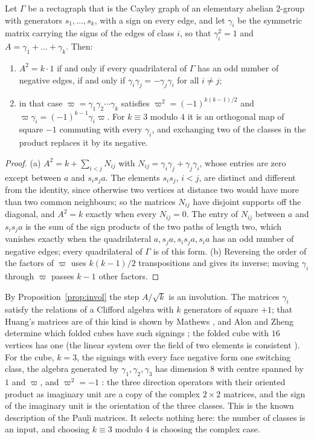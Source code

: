 \begin{proposition}\label{prop:clifford}
Let $\Gamma$ be a rectagraph that is the Cayley graph of an elementary abelian $2$-group with generators $s_1,\dots,s_k$, with a sign on every edge, and let $\gamma_i$ be the symmetric matrix carrying the signs of the edges of class $i$, so that $\gamma_i^2=1$ and $A=\gamma_1+\dots+\gamma_k$. Then:
\begin{enumerate}[label=(\alph*)]
\item $A^2=k\cdot1$ if and only if every quadrilateral of $\Gamma$ has an odd number of negative edges, if and only if $\gamma_i\gamma_j=-\gamma_j\gamma_i$ for all $i\ne j$;
\item in that case $\varpi=\gamma_1\gamma_2\cdots\gamma_k$ satisfies $\varpi^2=(-1)^{k(k-1)/2}$ and $\varpi\gamma_i=(-1)^{k-1}\gamma_i\varpi$. For $k\equiv3$ modulo $4$ it is an orthogonal map of square $-1$ commuting with every $\gamma_i$, and exchanging two of the classes in the product replaces it by its negative.
\end{enumerate}
\end{proposition}
\begin{proof}
(a) $A^2=k+\sum_{i<j}N_{ij}$ with $N_{ij}=\gamma_i\gamma_j+\gamma_j\gamma_i$, whose entries are zero except between $a$ and $s_is_ja$. The elements $s_is_j$, $i<j$, are distinct and different from the identity, since otherwise two vertices at distance two would have more than two common neighbours; so the matrices $N_{ij}$ have disjoint supports off the diagonal, and $A^2=k$ exactly when every $N_{ij}=0$. The entry of $N_{ij}$ between $a$ and $s_is_ja$ is the sum of the sign products of the two paths of length two, which vanishes exactly when the quadrilateral $a,s_ja,s_is_ja,s_ia$ has an odd number of negative edges; every quadrilateral of $\Gamma$ is of this form. (b) Reversing the order of the factors of $\varpi$ uses $k(k-1)/2$ transpositions and gives its inverse; moving $\gamma_i$ through $\varpi$ passes $k-1$ other factors.
\end{proof}

By Proposition~\ref{prop:invol} the step $A/\sqrt k$ is an involution. The matrices $\gamma_i$ satisfy the relations of a Clifford algebra with $k$ generators of square $+1$; that Huang's matrices are of this kind is shown by Mathews \cite{mathews}, and Alon and Zheng determine which folded cubes have such signings \cite{az}; the folded cube with $16$ vertices has one (the linear system over the field of two elements is consistent \cite{comp3}). For the cube, $k=3$, the signings with every face negative form one switching class, the algebra generated by $\gamma_1,\gamma_2,\gamma_3$ has dimension $8$ with centre spanned by $1$ and $\varpi$, and $\varpi^2=-1$ \cite{comp3}: the three direction operators with their oriented product as imaginary unit are a copy of the complex $2\times2$ matrices, and the sign of the imaginary unit is the orientation of the three classes. This is the known description of the Pauli matrices. It selects nothing here: the number of classes is an input, and choosing $k\equiv3$ modulo $4$ is choosing the complex case.

